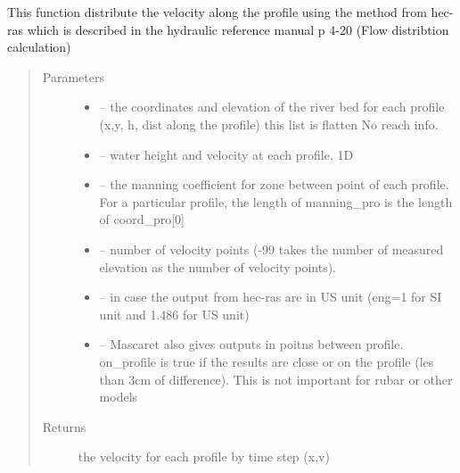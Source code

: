 \documentclass[letterpaper,10pt,english]{sphinxmanual}
\begin{document}
\begin{fulllineitems}
\label{\detokenize{index:src.dist_vistess2.dist_velocity_hecras}}
This function distribute the velocity along the profile using the method from hec-ras
which is described in the hydraulic reference manual p 4-20 (Flow distribtion calculation)
\begin{quote}\begin{description}
\item[{Parameters}] \leavevmode\begin{itemize}
\item {} 
 -- the coordinates and elevation of the river bed for each profile (x,y, h, dist along the profile)
this list is flatten No reach info.

\item {} 
 -- water height and velocity at each profile, 1D

\item {} 
 -- the manning coefficient for zone between point of each profile.
For a particular profile, the length of manning\_pro is the length of coord\_pro{[}0{]}

\item {} 
 -- number of velocity points (-99 takes the number of measured elevation as the number of velocity points).

\item {} 
 -- in case the output from hec-ras are in US unit (eng=1 for SI unit and 1.486 for US unit)

\item {} 
 -- Mascaret also gives outputs in poitns between profile. on\_profile is true if the results are
close or on the profile (les than 3cm of difference). This is not important for rubar or other models

\end{itemize}

\item[{Returns}] \leavevmode
the velocity for each profile by time step (x,v)

\end{description}\end{quote}


\end{fulllineitems}
\end{document}
